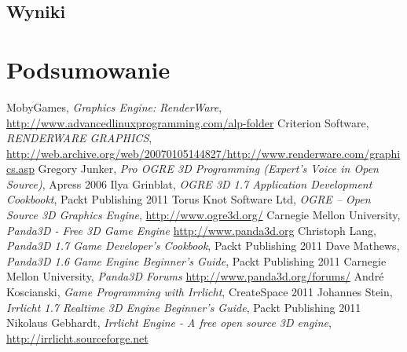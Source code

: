 \documentclass[11pt]{mwrep}
\begin{document}
  \section{Wyniki}

\chapter{Podsumowanie}


\begin{thebibliography}{99}

 MobyGames, \textit{Graphics Engine: RenderWare}, \url{http://www.advancedlinuxprogramming.com/alp-folder}
 Criterion Software, \textit{RENDERWARE GRAPHICS}, \url{http://web.archive.org/web/20070105144827/http://www.renderware.com/graphics.asp}
 Gregory Junker, \textit{Pro OGRE 3D Programming (Expert's Voice in Open Source)}, Apress 2006
 Ilya Grinblat, \textit{OGRE 3D 1.7 Application Development Cookbookt}, Packt Publishing 2011
 Torus Knot Software Ltd, \textit{OGRE -- Open Source 3D Graphics Engine}, \url{http://www.ogre3d.org/}
 Carnegie Mellon University, \textit{Panda3D - Free 3D Game Engine} \url{http://www.panda3d.org}
 Christoph Lang, \textit{Panda3D 1.7 Game Developer's Cookbook}, Packt Publishing 2011
 Dave Mathews, \textit{Panda3D 1.6 Game Engine Beginner's Guide}, Packt Publishing 2011
 Carnegie Mellon University, \textit{Panda3D Forums} \url{http://www.panda3d.org/forums/}
 André Koscianski, \textit{Game Programming with Irrlicht}, CreateSpace 2011
 Johannes Stein, \textit{Irrlicht 1.7 Realtime 3D Engine Beginner's Guide}, Packt Publishing 2011
 Nikolaus Gebhardt, \textit{Irrlicht Engine - A free open source 3D engine}, \url{http://irrlicht.sourceforge.net}
\end{thebibliography}

\end{document}
